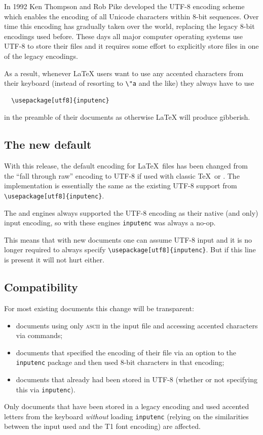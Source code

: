 \documentclass{ltnews}
\providecommand\acro[1]{\textsc{#1}}
\providecommand\pkg[1]{\texttt{#1}}
\begin{document}
In 1992 Ken Thompson and Rob Pike developed the UTF-8 encoding scheme
which enables the encoding of all Unicode characters within 8-bit sequences.
Over time this encoding has gradually taken over the world,
replacing the legacy 8-bit encodings used before. These days all major
computer operating systems use UTF-8 to store their files and it
requires some effort to explicitly store files in one of the legacy
encodings.

As a result, whenever \LaTeX{} users want to use any accented
characters from their keyboard (instead of resorting to \verb=\"a= and
the like) they always have to use
\begin{verbatim}
  \usepackage[utf8]{inputenc}
\end{verbatim}
in the preamble of their documents as otherwise \LaTeX{} will produce
gibberish.

\subsection{The new default}

With this release, the default encoding for \LaTeX\ files has been
changed from the ``fall through raw'' encoding to UTF-8 if used with
classic \TeX\ or . The implementation is essentially
the same as the existing UTF-8 support from
\verb|\usepackage[utf8]{inputenc}|.

The  and  engines always supported the
UTF-8 encoding as their native (and only) input encoding, so with
these engines \pkg{inputenc} was always a no-op.

This means that with new documents one can assume UTF-8 input and it
is no longer required to always specify
\verb|\usepackage[utf8]{inputenc}|. But if this line is present it
will not hurt either.


\subsection{Compatibility}

For most existing documents this change will be transparent:
\begin{itemize}
\item documents using only \acro{ascii} in the input file and
  accessing accented characters via commands;
\item documents that specified the encoding of their file via an
  option to the \pkg{inputenc} package and then used 8-bit
  characters in that encoding;
\item documents that already had been stored in UTF-8 (whether or not
  specifying this via \pkg{inputenc}).
\end{itemize}
Only documents that have been stored in a legacy encoding and used
accented letters from the keyboard \emph{without} loading
\pkg{inputenc} (relying on the similarities between the input used
and the T1 font encoding) are affected.
\end{document}
